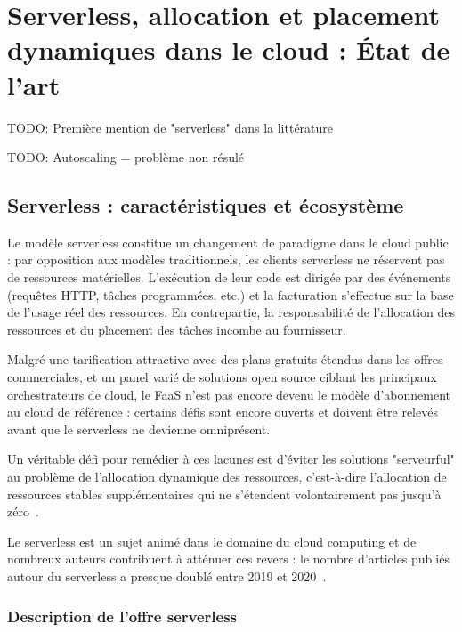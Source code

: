 \chapter{Serverless, allocation et placement dynamiques dans le cloud : État de l'art}
\label{chapter:sota}

TODO: Première mention de "serverless" dans la littérature~\cite{andersonServerlessNetworkFile}

TODO: Autoscaling = problème non résulé~\cite{straesserWhyItNot2022}

\section{Serverless : caractéristiques et écosystème}

Le modèle serverless constitue un changement de paradigme dans le cloud public : par opposition aux modèles traditionnels, les clients serverless ne réservent pas de ressources matérielles. L'exécution de leur code est dirigée par des événements (requêtes HTTP, tâches programmées, etc.) et la facturation s'effectue sur la base de l'usage réel des ressources. En contrepartie, la responsabilité de l'allocation des ressources et du placement des tâches incombe au fournisseur.

Malgré une tarification attractive avec des plans gratuits étendus dans les offres commerciales, et un panel varié de solutions open source ciblant les principaux orchestrateurs de cloud, le FaaS n'est pas encore devenu le modèle d'abonnement au cloud de référence : certains défis sont encore ouverts et doivent être relevés avant que le serverless ne devienne omniprésent.

Un véritable défi pour remédier à ces lacunes est d'éviter les solutions "serveurful" au problème de l'allocation dynamique des ressources, c'est-à-dire l'allocation de ressources stables supplémentaires qui ne s'étendent volontairement pas jusqu'à zéro~\cite{hellersteinServerlessComputingOne2019}.

Le serverless est un sujet animé dans le domaine du cloud computing et de nombreux auteurs contribuent à atténuer ces revers : le nombre d'articles publiés autour du serverless a presque doublé entre 2019 et 2020~\cite{hassanSurveyServerlessComputing2021}.

\subsection{Description de l'offre serverless}

